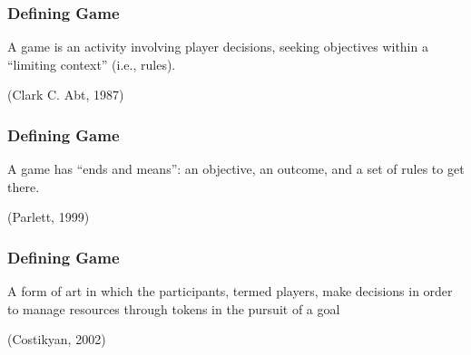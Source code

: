 \begin{frame}
	\frametitle{Defining Game}
		
	\begin{center}
	\begin{huge}
	A game is an activity involving player decisions, seeking objectives within a ``limiting context'' (i.e., rules).
	\end{huge}
	
	\vspace{3em}
	
	(Clark C. Abt, 1987)
	\end{center}

\end{frame}

\begin{frame}
	\frametitle{Defining Game}
		
	\begin{center}
	\begin{huge}
	A game has ``ends and means'': an objective, an outcome, and a set of rules to get there.
	\end{huge}
	
	\vspace{3em}
	
	(Parlett, 1999)
	\end{center}

\end{frame}

\begin{frame}
	\frametitle{Defining Game}
		
	\begin{center}
	\begin{huge}
	A form of art in which the participants, termed players, make decisions in order to manage resources through tokens in the pursuit of a goal
	\end{huge}
	
	\vspace{3em}
	
	(Costikyan, 2002)
	\end{center}

\end{frame}

